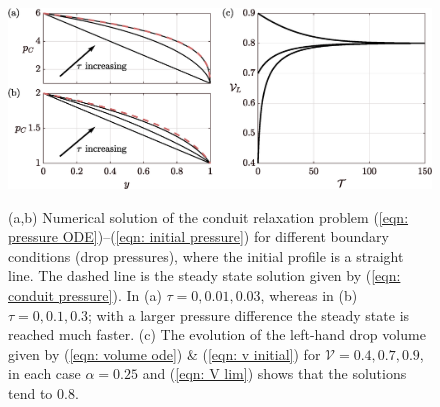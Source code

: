 \documentclass{jfm}
\begin{document}
\begin{figure} 
\centering
 {\includegraphics[width=1\linewidth]{Figures/Relaxation_Drainage}}  
  \caption{
  (a,b) Numerical solution of the conduit relaxation problem (\ref{eqn: pressure ODE})--(\ref{eqn: initial pressure}) for different boundary conditions (drop pressures), where the initial profile is a straight line.
  The dashed  line is the steady state solution given by  (\ref{eqn:  conduit  pressure}).
  In (a) $ \tau = 0, 0.01,0.03$, whereas in (b) $\tau =0,0.1,0.3$; with a larger pressure difference the steady state is reached much faster. 
  (c) The evolution of the left-hand drop volume given by  (\ref{eqn: volume ode}) \& (\ref{eqn: v initial}) for $ \mathcal{V} = 0.4,0.7 ,0.9$, in each case $ \alpha = 0.25$ and (\ref{eqn: V lim})  shows that the solutions tend to $0.8$.
  } \label{fig: drainage}
\end{figure}
\end{document}
